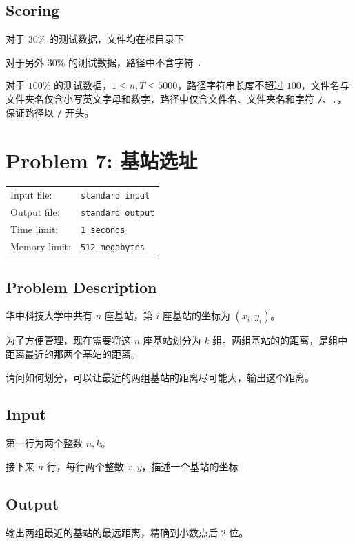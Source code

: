 \documentclass[12]{article}%
\begin{document}
	\subsection*{\textsf{Scoring}}
	
	\noindent 对于 $30\%$ 的测试数据，文件均在根目录下
	
	\noindent 对于另外 $30\%$ 的测试数据，路径中不含字符 \texttt{.}
	
	\noindent 对于 $100\%$ 的测试数据，$1 \le n,T \le 5000$，路径字符串长度不超过 $100$，文件名与文件夹名仅含小写英文字母和数字，路径中仅含文件名、文件夹名和字符 \texttt{/}、\texttt{.}，保证路径以 \texttt{/} 开头。

\newpage

\section*{\textsf{Problem 7: }\textrm{基站选址}}
\begin{tabular}{ll}
	\fontsize{10pt}{10pt} Input file: & \fontsize{10pt}{10pt}\texttt{standard input} \\
	\fontsize{10pt}{10pt} Output file: & \fontsize{10pt}{10pt}\texttt{standard output}\\
	\fontsize{10pt}{10pt} Time limit: & \fontsize{10pt}{10pt}\texttt{1 seconds} \\
	\fontsize{10pt}{10pt} Memory limit: & \fontsize{10pt}{10pt}\texttt{512 megabytes}\\
\end{tabular}
\subsection*{\textsf{Problem Description}}
华中科技大学中共有 $n$ 座基站，第 $i$ 座基站的坐标为 $(x_i,y_i)$。

为了方便管理，现在需要将这 $n$ 座基站划分为 $k$ 组。两组基站的的距离，是组中距离最近的那两个基站的距离。

请问如何划分，可以让最近的两组基站的距离尽可能大，输出这个距离。

\subsection*{\textsf{Input}}
\noindent 第一行为两个整数 $n,k$。

\noindent 接下来 $n$ 行，每行两个整数 $x,y$，描述一个基站的坐标

\subsection*{\textsf{Output}}
\noindent 输出两组最近的基站的最远距离，精确到小数点后 2 位。
\end{document}
